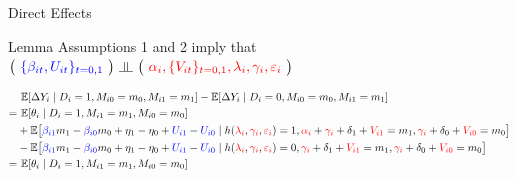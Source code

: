 \documentclass[aspectratio=1610, 9pt]{beamer}
\newcommand{\indep}{\rotatebox[origin=c]{90}{$\models$}}
\begin{document}
\begin{frame}{Direct Effects}

\begin{block}{Lemma}
   Assumptions 1 and 2 imply that $  \big(\ \textcolor{blue}{\{\beta_{it},U_{it}\}_{t=0,1}} \ \big) \ \indep\ \big(\ \textcolor{red}{\alpha_i,\{V_{it}\}_{t=0,1},\lambda_i,\gamma_i,\varepsilon_i}\ \big)$
\end{block}

\begin{align*}
    &\ \mathbb E[\Delta Y_i \mid D_i=1, M_{i0}=m_0, M_{i1}=m_1]- \mathbb E[\Delta Y_i \mid D_i=0, M_{i0}=m_0, M_{i1}=m_1]\\
    =&\ \mathbb E[\theta_i \mid D_i=1, M_{i1}=m_1, M_{i0}=m_0]\\
    & + \mathbb E\big[\textcolor{blue}{\beta_{i1}}m_{1}-\textcolor{blue}{\beta_{i0}}m_{0}+\eta_1-\eta_0 + \textcolor{blue}{U_{i1}}-\textcolor{blue}{U_{i0}}\mid h(\textcolor{red}{\lambda_i}, \textcolor{red}{\gamma_i},\textcolor{red}{\varepsilon_i})=1, \textcolor{red}{\alpha_i}+\textcolor{red}{\gamma_i}+\delta_1+\textcolor{red}{V_{i1}}=m_1, \textcolor{red}{\gamma_i}+\delta_0+\textcolor{red}{V_{i0}}=m_0\big]\\
    & -\mathbb E\big[\textcolor{blue}{\beta_{i1}}m_{1}-\textcolor{blue}{\beta_{i0}}m_{0}+\eta_1-\eta_0 + \textcolor{blue}{U_{i1}}-\textcolor{blue}{U_{i0}}\mid h(\textcolor{red}{\lambda_i},\textcolor{red}{\gamma_i},\textcolor{red}{\varepsilon_i})=0, \textcolor{red}{\gamma_i}+\delta_1+\textcolor{red}{V_{i1}}=m_1, \textcolor{red}{\gamma_i}+\delta_0+\textcolor{red}{V_{i0}}=m_0\big]\\
    =&\ \mathbb E[\theta_i \mid D_i=1, M_{i1}=m_1, M_{i0}=m_0]
\end{align*}
    
\end{frame}
\end{document}
